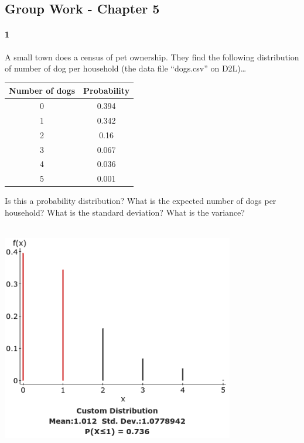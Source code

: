 \documentclass{article}
\begin{document}
\begin{flushleft}
\section*{Group Work - Chapter 5}
\paragraph{1} A small town does a census of pet ownership. They find the following distribution of number of dog per household  (the data file ``dogs.csv'' on D2L)\ldots\\
{\centering
\begin{tabular}{c | c}
Number of dogs & Probability\\
\hline
0 & 0.394\\
1 & 0.342\\
2 & 0.16\\
3 & 0.067\\
4 & 0.036\\
5 & 0.001\\
\end{tabular} \par}
\begin{enumalpha}
\item Is this a probability distribution? What is the expected number of dogs per household? What is the standard deviation? What is the variance?\\
\medskip
{}\\
\medskip
{\centering
\includegraphics[width=4in]{images/grp05_Q1_a}
\par}



\end{enumalpha}
\end{flushleft}
\end{document}
